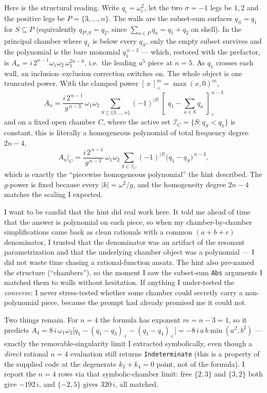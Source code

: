 \documentclass{article}
\newcommand{\pp}[1]{\left[\,#1\,\right]_{+}}
\begin{document}
Here is the structural reading. Write $q_i=\omega_i^2$, let the two $\sigma=-1$
legs be $1,2$ and the positive legs be $P=\{3,\dots,n\}$. The walls are the
subset-sum surfaces $q_S=q_1$ for $S\subseteq P$ (equivalently
$q_{P\setminus S}=q_2$, since $\sum_{a\in P}q_a=q_1+q_2$ on shell). In the
principal chamber where $q_1$ is below every $q_S$, only the empty subset survives and
the polynomial is the bare monomial $q_1^{\,n-3}$ --- which, restored with the
prefactor, is $A_n=i\,2^{n-1}\omega_1\omega_2\,\omega_1^{2n-6}$, i.e.\ the leading
$a^5$ piece at $n=5$. As $q_1$ crosses each wall, an inclusion--exclusion
correction switches on. The whole object is one truncated power. With the
clamped power $\pp{x}^m=\max(x,0)^m$,
\[
\boxed{\;
A_n
=
\frac{i\,2^{\,n-1}}{g^{\,n-3}}\,\omega_1\omega_2
\sum_{S\subseteq\{3,\dots,n\}}(-1)^{|S|}\,
\pp{\,q_1-\textstyle\sum_{a\in S}q_a\,}^{\,n-3}\;}
\]
and on a fixed open chamber $C$, where the active set
$\mathcal I_C=\{S:q_S<q_1\}$ is constant, this is literally a homogeneous
polynomial of total frequency degree $2n-4$,
\[
A_n\big|_C
=
\frac{i\,2^{\,n-1}}{g^{\,n-3}}\,\omega_1\omega_2
\sum_{S\in\mathcal I_C}(-1)^{|S|}\big(q_1-q_S\big)^{\,n-3},
\]
which is exactly the ``piecewise homogeneous polynomial'' the hint described. The
$g$-power is fixed because every $|k|=\omega^2/g$, and the homogeneity degree
$2n-4$ matches the scaling I expected.

I want to be candid that the hint did real work here. It told me ahead of time
that the answer is polynomial on each piece, so when my chamber-by-chamber
simplifications came back as clean rationals with a common $(a+b+c)$ denominator,
I trusted that the denominator was an artifact of the resonant parametrization
and that the underlying chamber object was a polynomial --- I did not waste time
chasing a rational-function ansatz. The hint also pre-named the structure
(``chambers''), so the moment I saw the subset-sum \texttt{Abs} arguments I
matched them to walls without hesitation. If anything I under-tested the
\emph{converse}: I never stress-tested whether some chamber could secretly carry a
non-polynomial piece, because the prompt had already promised me it could not.

Two things remain. For $n=4$ the formula has exponent $m=n-3=1$, so it predicts
$A_4=8\,i\,\omega_1\omega_2\big[q_1-(q_1-q_3)_+-(q_1-q_4)_+\big]
=-8\,i\,a\,b\min(a^2,b^2)$ --- exactly the removable-singularity limit I extracted
symbolically, even though a \emph{direct} rational $n=4$ evaluation still returns
\texttt{Indeterminate} (this is a property of the supplied code at the degenerate
$k_2+k_4=0$ point, not of the formula). I report the $n=4$ rows via that
symbolic-chamber limit: free $\{2,3\}$ and $\{3,2\}$ both give $-192\,i$, and
$\{-2,5\}$ gives $320\,i$, all matched.
\end{document}
